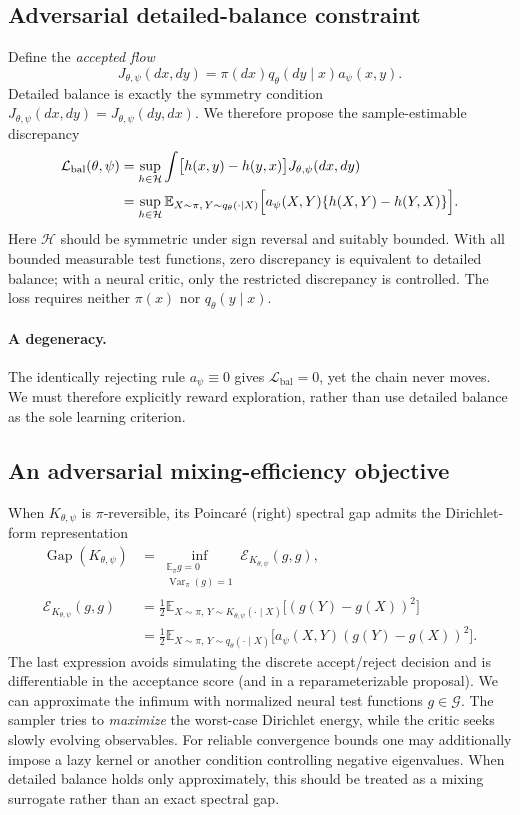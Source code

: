 \documentclass[11pt]{article}
\newcommand{\bbE}{\mathbb{E}}
\begin{document}
\subsection{Adversarial detailed-balance constraint}
Define the \emph{accepted flow}
\begin{equation}
J_{\theta,\psi}(dx,dy)=\pi(dx)q_\theta(dy\mid x)a_\psi(x,y).
\label{eq:accepted-flow}
\end{equation}
Detailed balance is exactly the symmetry condition $J_{\theta,\psi}(dx,dy)=J_{\theta,\psi}(dy,dx)$. We therefore propose the sample-estimable discrepancy
\begin{align}
\mathcal L_{\mathrm{bal}}(\theta,\psi)
&=\sup_{h\in\mathcal H}\int\!\big[h(x,y)-h(y,x)\big]J_{\theta,\psi}(dx,dy)\notag\\
&=\sup_{h\in\mathcal H}\bbE_{X\sim\pi,\,Y\sim q_\theta(\cdot\mid X)}
\Big[a_\psi(X,Y)\{h(X,Y)-h(Y,X)\}\Big].
\label{eq:balance}
\end{align}
Here $\mathcal H$ should be symmetric under sign reversal and suitably bounded. With all bounded measurable test functions, zero discrepancy is equivalent to detailed balance; with a neural critic, only the restricted discrepancy is controlled. The loss requires neither $\pi(x)$ nor $q_\theta(y\mid x)$.

\paragraph{A degeneracy.} The identically rejecting rule $a_\psi\equiv0$ gives $\mathcal L_{\mathrm{bal}}=0$, yet the chain never moves. We must therefore explicitly reward exploration, rather than use detailed balance as the sole learning criterion.

\subsection{An adversarial mixing-efficiency objective}
When $K_{\theta,\psi}$ is $\pi$-reversible, its Poincar\'e (right) spectral gap admits the Dirichlet-form representation
\begin{align}
\operatorname{Gap}(K_{\theta,\psi})
&=\inf_{\substack{\bbE_\pi g=0\\\operatorname{Var}_\pi(g)=1}}
\mathcal E_{K_{\theta,\psi}}(g,g),\\
\mathcal E_{K_{\theta,\psi}}(g,g)
&=\frac12 \bbE_{X\sim\pi,\,Y\sim K_{\theta,\psi}(\cdot\mid X)}
\big[(g(Y)-g(X))^2\big]\\
&=\frac12 \bbE_{X\sim\pi,\,Y\sim q_\theta(\cdot\mid X)}
\Big[a_\psi(X,Y)(g(Y)-g(X))^2\Big].
\label{eq:dirichlet}
\end{align}
The last expression avoids simulating the discrete accept/reject decision and is differentiable in the acceptance score (and in a reparameterizable proposal). We can approximate the infimum with normalized neural test functions $g\in\mathcal G$. The sampler tries to \emph{maximize} the worst-case Dirichlet energy, while the critic seeks slowly evolving observables. For reliable convergence bounds one may additionally impose a lazy kernel or another condition controlling negative eigenvalues. When detailed balance holds only approximately, this should be treated as a mixing surrogate rather than an exact spectral gap.
\end{document}
